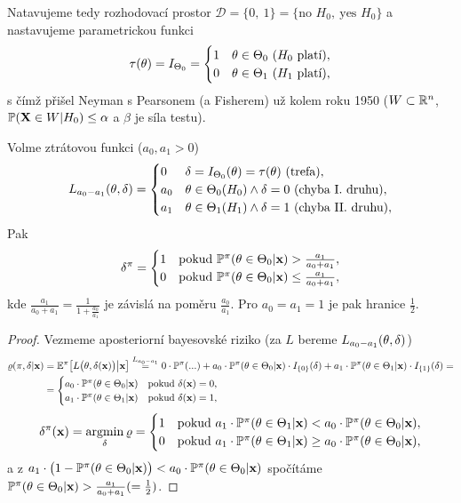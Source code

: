 Natavujeme tedy rozhodovací prostor $\mathscr{D}=\{0,~1\}=\{\text{no }H_0,~\text{yes }H_0\}$ a nastavujeme parametrickou funkci
$$ \tau(\theta)=I_{\Theta_0}=\begin{cases}
1& \theta\in\Theta_0~(H_0\text{ platí}),\\0& \theta\in\Theta_1~(H_1\text{ platí}),
\end{cases}$$ s čímž přišel Neyman s Pearsonem (a Fisherem) už kolem roku 1950 ($W\subset\mathbb{R}^n$, $\mathbb{P}(\textbf{X}\in W|H_0)\leq \alpha$ a $\beta$ je síla testu).
\begin{theorem}
	Volme ztrátovou funkci ($a_0,a_1>0$) $$L_{a_0-a_1}(\theta,\delta)=\begin{cases}
	0&\delta=I_{\Theta_0}(\theta)=\tau(\theta)~(\text{trefa}),\\a_0& \theta\in\Theta_0(H_0)\wedge \delta=0~(\text{chyba I. druhu}),\\a_1& \theta\in\Theta_1(H_1)\wedge \delta=1~(\text{chyba II. druhu}),
	\end{cases}$$
	Pak $$\delta^\pi=\begin{cases}
	1& \text{pokud }\mathbb{P}^\pi(\theta\in\Theta_0|\textbf{x})>\frac{a_1}{a_0+a_1},\\
	0& \text{pokud }\mathbb{P}^\pi(\theta\in\Theta_0|\textbf{x})\leq\frac{a_1}{a_0+a_1},
	\end{cases}$$ kde $\frac{a_1}{a_0+a_1}=\frac{1}{1+\frac{a_0}{a_1}}$ je závislá na poměru $\frac{a_0}{a_1}$. Pro $a_0=a_1=1$ je pak hranice $\frac{1}{2}$.
	\begin{proof}
		Vezmeme aposteriorní bayesovské riziko (za $L$ bereme $L_{a_0-a_1}(\theta,\delta)$)
		\[
		\begin{split}
		\varrho(\pi,\delta|\textbf{x})&=\mathbb{E}^\pi\big[L\big(\theta,\delta(\textbf{x})\big)\big| \textbf{x}\big]\overset{L_{a_0-a_1}}{=}0\cdot\mathbb{P}^{\pi}(...)+a_0\cdot \mathbb{P}^\pi(\theta\in\Theta_0|\textbf{x})\cdot I_{\{0\}}(\delta)+a_1 \cdot\mathbb{P}^\pi (\theta\in\Theta_1|\textbf{x})\cdot I_{\{1\}}(\delta)=\\&=\begin{cases}
		a_0\cdot \mathbb{P}^\pi(\theta\in\Theta_0|\textbf{x})&\text{pokud }\delta(\textbf{x})=0,\\
		a_1\cdot \mathbb{P}^\pi(\theta\in\Theta_1|\textbf{x})&\text{pokud }\delta(\textbf{x})=1,
		\end{cases}
		\end{split}
		\] 		
		$$ \delta^\pi(\textbf{x})=\mathop{\mathrm{argmin}}_\delta \varrho=\begin{cases}
		1&\text{pokud }a_1\cdot\mathbb{P}^\pi(\theta\in\Theta_1|\textbf{x})<a_0\cdot\mathbb{P}^\pi(\theta\in\Theta_0|\textbf{x}),\\
		0&\text{pokud }a_1\cdot\mathbb{P}^\pi(\theta\in\Theta_1|\textbf{x})\geq a_0\cdot\mathbb{P}^\pi(\theta\in\Theta_0|\textbf{x}),\\
		\end{cases} $$
		a z $a_1\cdot\big(1-\mathbb{P}^\pi(\theta\in\Theta_0|\textbf{x})\big)<a_0\cdot\mathbb{P}^\pi(\theta\in\Theta_0|\textbf{x})$ spočítáme $\mathbb{P}^\pi(\theta\in\Theta_0|\textbf{x})>\frac{a_1}{a_0+a_1}(=\frac{1}{2})$.
	\end{proof}
\end{theorem}
